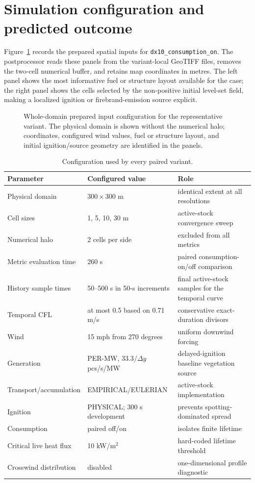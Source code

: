 \section{Simulation configuration and predicted outcome}

Figure~\ref{fig:input-configuration} records the prepared spatial inputs for \texttt{dx10\_consumption\_on}.
The postprocessor reads these panels from the variant-local GeoTIFF files, removes the
two-cell numerical buffer, and retains map coordinates in metres.  The left panel shows
the most informative fuel or structure layout available for the case; the right panel
shows the cells selected by the non-positive initial level-set field, making a localized
ignition or firebrand-emission source explicit.

\begin{figure}[H]
\centering
{}
\caption{Whole-domain prepared input configuration for the representative variant.  The
physical domain is shown without the numerical halo; coordinates, configured wind values,
fuel or structure layout, and initial ignition/source geometry are identified in the panels.}
\label{fig:input-configuration}
\end{figure}

\begin{table}[htbp]
\centering
\small
\begin{tabular}{p{}p{}p{}}
\toprule
Parameter & Configured value & Role \\
\midrule
Physical domain & $300\times300$ m & identical extent at all resolutions \\
Cell sizes & 1, 5, 10, 30 m & active-stock convergence sweep \\
Numerical halo & 2 cells per side & excluded from all metrics \\
Metric evaluation time & 260 s & paired consumption-on/off comparison \\
History sample times & 50--500 s in 50-s increments & final active-stock samples for the temporal curve \\
Temporal CFL & at most 0.5 based on 0.71 m/s & conservative exact-duration divisors \\
Wind & 15 mph from 270 degrees & uniform downwind forcing \\
Generation & PER-MW, $33.3/\Delta y$ pcs/s/MW & delayed-ignition baseline vegetation source \\
Transport/accumulation & EMPIRICAL/EULERIAN & active-stock implementation \\
Ignition & PHYSICAL; 300 s development & prevents spotting-dominated spread \\
Consumption & paired off/on & isolates finite lifetime \\
Critical live heat flux & 10 kW/m$^2$ & hard-coded lifetime threshold \\
Crosswind distribution & disabled & one-dimensional profile diagnostic \\
\bottomrule
\end{tabular}
\caption{Configuration used by every paired variant.}
\end{table}


